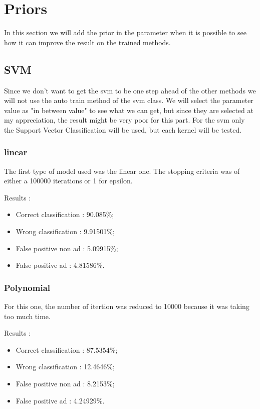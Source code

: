 \chapter{Priors}

In this section we will add the prior in the parameter when it is possible to see how it can improve the result on the trained methods.

\section{SVM}

Since we don't want to get the svm to be one step ahead of the other methods we will not use the auto train method of the svm class. We will select the parameter value as "in between value" to see what we can get, but since they are selected at my appreciation, the result might be very poor for this part.
For the svm only the Support Vector Classification will be used, but each kernel will be tested.


\subsection{linear}

The first type of model used was the linear one. The stopping criteria was of either a 100000 iterations or 1 for epsilon.

Results :
\begin{itemize}
  \item Correct classification : 90.085\%;
  \item Wrong classification : 9.91501\%;
  \item False positive non ad : 5.09915\%;
  \item False positive ad : 4.81586\%.
\end{itemize}


\subsection{Polynomial}

For this one, the number of itertion was reduced to 10000 because it was taking too much time.

Results :
\begin{itemize}
  \item Correct classification : 87.5354\%;
  \item Wrong classification : 12.4646\%;
  \item False positive non ad : 8.2153\%;
  \item False positive ad : 4.24929\%.
\end{itemize}

